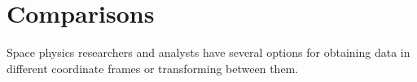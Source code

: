 \documentclass[draft]{agujournal2019}
\begin{document}
\begin{itemize}
     


\end{itemize}


\section{Comparisons}
\label{sect:comparisons}

Space physics researchers and analysts have several options for obtaining data in different coordinate frames or transforming between them.
\end{document}
